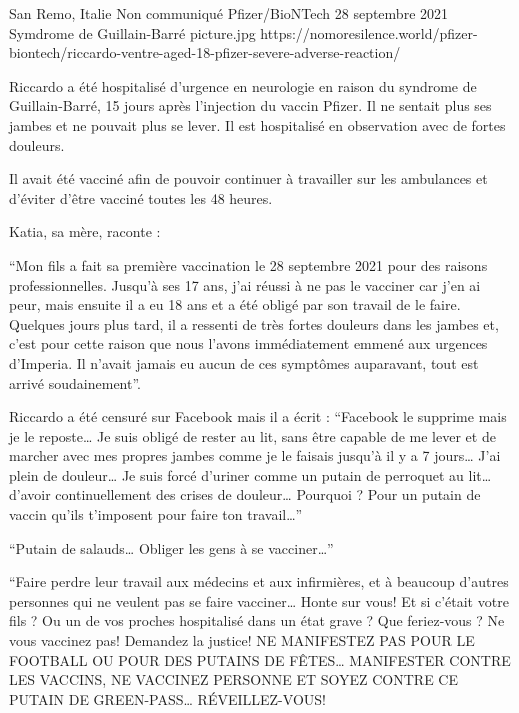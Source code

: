 {San Remo, Italie}
{Non communiqué}
{Pfizer/BioNTech}
{28 septembre 2021}
{Symdrome de Guillain-Barré}
{picture.jpg}
{https://nomoresilence.world/pfizer-biontech/riccardo-ventre-aged-18-pfizer-severe-adverse-reaction/}
{

Riccardo a été hospitalisé d'urgence en neurologie en raison du syndrome de
Guillain-Barré, 15 jours après l'injection du vaccin Pfizer. Il ne sentait plus
ses jambes et ne pouvait plus se lever. Il est hospitalisé en observation avec
de fortes douleurs.

Il avait été vacciné afin de pouvoir continuer à travailler sur les ambulances
et d'éviter d'être vacciné toutes les 48 heures.

Katia, sa mère, raconte :

“Mon fils a fait sa première vaccination le 28 septembre 2021 pour des raisons
professionnelles. Jusqu'à ses 17 ans, j'ai réussi à ne pas le vacciner car j'en
ai peur, mais ensuite il a eu 18 ans et a été obligé par son travail de le
faire. Quelques jours plus tard, il a ressenti de très fortes douleurs dans les
jambes et, c'est pour cette raison que nous l'avons immédiatement emmené aux
urgences d'Imperia. Il n'avait jamais eu aucun de ces symptômes auparavant, tout
est arrivé soudainement”.

Riccardo a été censuré sur Facebook mais il a écrit : “Facebook le supprime mais
je le reposte… Je suis obligé de rester au lit, sans être capable de me lever et
de marcher avec mes propres jambes comme je le faisais jusqu'à il y a 7 jours…
J'ai plein de douleur… Je suis forcé d'uriner comme un putain de perroquet au
lit… d'avoir continuellement des crises de douleur… Pourquoi ? Pour un putain de
vaccin qu'ils t'imposent pour faire ton travail…”

“Putain de salauds… Obliger les gens à se vacciner…”

“Faire perdre leur travail aux médecins et aux infirmières, et à beaucoup
d'autres personnes qui ne veulent pas se faire vacciner… Honte sur vous! Et si
c'était votre fils ? Ou un de vos proches hospitalisé dans un état grave ? Que
feriez-vous ? Ne vous vaccinez pas! Demandez la justice! NE MANIFESTEZ PAS POUR
LE FOOTBALL OU POUR DES PUTAINS DE FÊTES… MANIFESTER CONTRE LES VACCINS, NE
VACCINEZ PERSONNE ET SOYEZ CONTRE CE PUTAIN DE GREEN-PASS… RÉVEILLEZ-VOUS!

}
